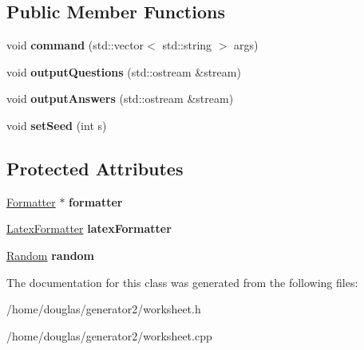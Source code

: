 \subsection*{Public Member Functions}
\begin{DoxyCompactItemize}
\item 
void {\bfseries command} (std\+::vector$<$ std\+::string $>$ args)\hypertarget{classWorksheet_ad401426530bff351d40adc7ec73784a2}{}\label{classWorksheet_ad401426530bff351d40adc7ec73784a2}

\item 
void {\bfseries output\+Questions} (std\+::ostream \&stream)\hypertarget{classWorksheet_a1ff6cfb77a4111904f38bcf1db7ec4f5}{}\label{classWorksheet_a1ff6cfb77a4111904f38bcf1db7ec4f5}

\item 
void {\bfseries output\+Answers} (std\+::ostream \&stream)\hypertarget{classWorksheet_a876ec2465c624ef1de3f802eb1232d54}{}\label{classWorksheet_a876ec2465c624ef1de3f802eb1232d54}

\item 
void {\bfseries set\+Seed} (int s)\hypertarget{classWorksheet_a9507a0e1d20c522b4a9937ed6442b6ca}{}\label{classWorksheet_a9507a0e1d20c522b4a9937ed6442b6ca}

\end{DoxyCompactItemize}
\subsection*{Protected Attributes}
\begin{DoxyCompactItemize}
\item 
\hyperlink{classFormatter}{Formatter} $\ast$ {\bfseries formatter}\hypertarget{classWorksheet_abcf8886331c80095aacc580026c52e3f}{}\label{classWorksheet_abcf8886331c80095aacc580026c52e3f}

\item 
\hyperlink{classLatexFormatter}{Latex\+Formatter} {\bfseries latex\+Formatter}\hypertarget{classWorksheet_a71b24ac8eed1df4e2928a7cdb433f849}{}\label{classWorksheet_a71b24ac8eed1df4e2928a7cdb433f849}

\item 
\hyperlink{classRandom}{Random} {\bfseries random}\hypertarget{classWorksheet_ac45fc8dc79a8da9d2d6dcc6f4d4e121e}{}\label{classWorksheet_ac45fc8dc79a8da9d2d6dcc6f4d4e121e}

\end{DoxyCompactItemize}


The documentation for this class was generated from the following files\+:\begin{DoxyCompactItemize}
\item 
/home/douglas/generator2/worksheet.\+h\item 
/home/douglas/generator2/worksheet.\+cpp\end{DoxyCompactItemize}
